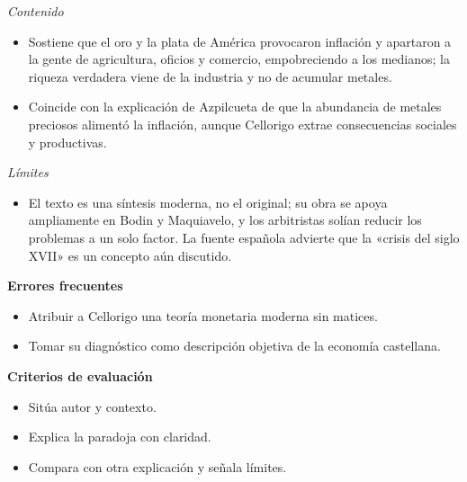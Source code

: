\documentclass{book}
\begin{document}
\begin{tcolorbox}[title={Ejercicio resuelto}, studiumworked, breakable]
\noindent\textit{Contenido}
\begin{itemize}
\item Sostiene que el oro y la plata de América provocaron inflación y apartaron a la gente de agricultura, oficios y comercio, empobreciendo a los medianos; la riqueza verdadera viene de la industria y no de acumular metales.
\item Coincide con la explicación de Azpilcueta de que la abundancia de metales preciosos alimentó la inflación, aunque Cellorigo extrae consecuencias sociales y productivas.
\end{itemize}

\noindent\textit{Límites}
\begin{itemize}
\item El texto es una síntesis moderna, no el original; su obra se apoya ampliamente en Bodin y Maquiavelo, y los arbitristas solían reducir los problemas a un solo factor. La fuente española advierte que la «crisis del siglo XVII» es un concepto aún discutido.
\end{itemize}

\noindent\textbf{Errores frecuentes}
\begin{itemize}
\item Atribuir a Cellorigo una teoría monetaria moderna sin matices.
\item Tomar su diagnóstico como descripción objetiva de la economía castellana.
\end{itemize}

\noindent\textbf{Criterios de evaluación}
\begin{itemize}
\item Sitúa autor y contexto.
\item Explica la paradoja con claridad.
\item Compara con otra explicación y señala límites.
\end{itemize}
\end{tcolorbox}
\end{document}
